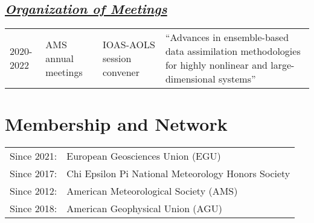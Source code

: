 \documentclass{article}
\newcommand{\cvsection}[1]{\section*{\bfseries#1}}
\newcommand{\cvsubsection}[1]{\subsection*{\itshape\uline{#1}}}
\begin{document}
\cvsubsection{Organization of Meetings}
\begin{tabular}{l p{4cm} p{3cm} p{6cm}}
    2020-2022 & AMS annual meetings & IOAS-AOLS session convener & ``Advances in ensemble-based data assimilation methodologies for highly nonlinear and large-dimensional systems'' \\
\end{tabular}

\cvsection{Membership and Network}
\begin{tabular}{l l}
    Since 2021: & European Geosciences Union (EGU) \\
    Since 2017: & Chi Epsilon Pi National Meteorology Honors Society \\
    Since 2012: & American Meteorological Society (AMS) \\
    Since 2018: & American Geophysical Union (AGU) \\
\end{tabular}
\end{document}
